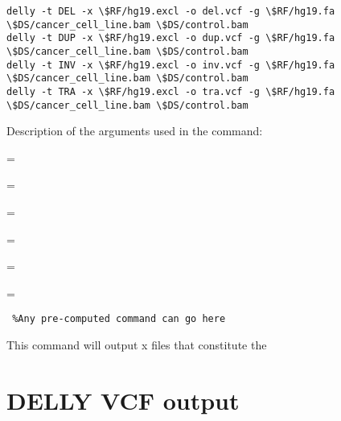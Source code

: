 \begin{lstlisting}
delly -t DEL -x \$RF/hg19.excl -o del.vcf -g \$RF/hg19.fa \$DS/cancer_cell_line.bam \$DS/control.bam
delly -t DUP -x \$RF/hg19.excl -o dup.vcf -g \$RF/hg19.fa \$DS/cancer_cell_line.bam \$DS/control.bam
delly -t INV -x \$RF/hg19.excl -o inv.vcf -g \$RF/hg19.fa \$DS/cancer_cell_line.bam \$DS/control.bam
delly -t TRA -x \$RF/hg19.excl -o tra.vcf -g \$RF/hg19.fa \$DS/cancer_cell_line.bam \$DS/control.bam

\end{lstlisting}

Description of the arguments used in the command: 
\begin{description}[style=multiline,labelindent=0cm,align=right,leftmargin=\descriptionlabelspace,rightmargin=1.5cm,font=\ttfamily]
  \item[DEL] = 
  \item[DUP] = 
  \item[INV] = 
  \item[TRA] = 
  \item[-o] = 
  \item[-g] = 
\end{description}

\begin{warning}
  \begin{lstlisting}
 %Any pre-computed command can go here
  \end{lstlisting}
\end{warning}

This command will output x files that constitute the 

\section{DELLY VCF output}

